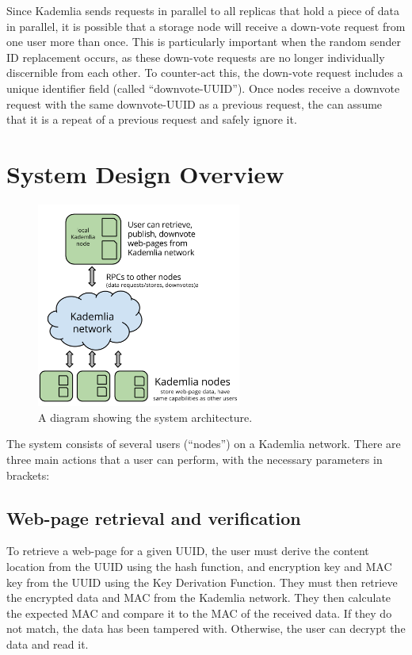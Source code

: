 Since Kademlia sends requests in parallel to all replicas that hold a piece of data in parallel, it is possible that a storage
node will receive a down-vote request from one user more than once. This is particularly important when the random sender ID
replacement occurs, as these down-vote requests are no longer individually discernible from each other. To counter-act this,
the down-vote request includes a unique identifier field (called ``downvote-UUID''). Once nodes receive a downvote request
with the same downvote-UUID as a previous request, the can assume that it is a repeat of a previous request and safely ignore it.

\section{System Design Overview}

\begin{figure}[H]
    \centering
    \includegraphics[width=0.6\textwidth]{img/arch.png}
    \caption{A diagram showing the system architecture.}
    \label{fig:arch}
\end{figure}

The system consists of several users (``nodes'') on a Kademlia network. There are three main actions that a user can perform,
with the necessary parameters in brackets:

\subsection{Web-page retrieval and verification}

To retrieve a web-page for a given UUID, the user must derive the content location from the UUID using the hash function,
and encryption key and MAC key from the UUID using the Key Derivation Function. They must then retrieve the encrypted data
and MAC from the Kademlia network. They then calculate the expected MAC and compare it to the MAC of the received data. If
they do not match, the data has been tampered with. Otherwise, the user can decrypt the data and read it.

